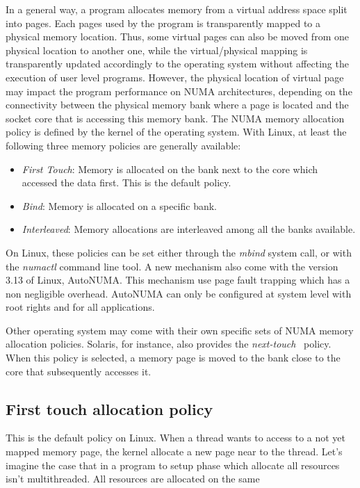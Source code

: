 In a general way, a program allocates memory from a virtual address space split into pages.
%
Each pages used by the program is transparently mapped to a physical memory location.
%
Thus, some virtual pages can also be moved from one physical location to another one, while the virtual/physical mapping is transparently updated accordingly to the operating system without affecting the execution of user level programs.
%
However, the physical location of virtual page may impact the program performance on NUMA architectures, depending on the
connectivity between the physical memory bank where a page is located and the socket core that is accessing this memory bank.
%
The NUMA memory allocation policy is defined by the kernel of the operating system.
%
With Linux, at least the following three memory policies are generally available:
\begin{itemize}
        \item {\em First Touch}: Memory is allocated on the bank next to the core which accessed the data first.
                         This is the default policy.
        \item {\em Bind}: Memory is allocated on a specific bank.
        \item {\em Interleaved}: Memory allocations are interleaved among
  all the banks available.
\end{itemize}
On Linux, these policies can be set either through the \textit{mbind} system call, or with the {\em numactl} command line tool.
%
A new mechanism also come with the version 3.13 of Linux, AutoNUMA.
%
This mechanism use page fault trapping which has a non negligible overhead.
%
AutoNUMA can only be configured at system level with root rights and for all applications.


Other operating system may come with their own specific sets of NUMA memory allocation policies.
%
Solaris, for instance, also provides the \textit{next-touch}~\cite{next_touch} policy.
%
When this policy is selected, a memory page is moved to the bank close to the core that subsequently accesses it.

\subsection{First touch allocation policy}
This is the default policy on Linux.
%
When a thread wants to access to a not yet mapped memory page, the kernel allocate a new page near to the thread.
%
Let's imagine the case that in a program to setup phase which allocate all resources isn't multithreaded.
%
All resources are allocated on the same

